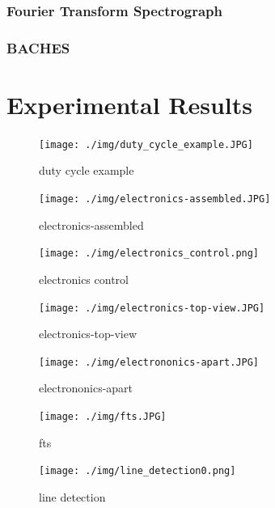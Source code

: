 \documentclass[master,       %
               twoside,        %
               BCOR10mm,       %
               ngerman,english  %
               ]{GAUBM_astro}
\begin{document}
\subsection{Fourier Transform Spectrograph}
\subsection{BACHES}

\chapter{Experimental Results}




\begin{figure}[h!]
\centering
\texttt{[image: ./img/duty\_cycle\_example.JPG]}
\caption{duty cycle example}
\label{fig:duty-cycle-example}
\end{figure}


\begin{figure}[h!]
\centering
\texttt{[image: ./img/electronics-assembled.JPG]}
\caption{electronics-assembled}
\label{fig:electronics-assembled}
\end{figure}


\begin{figure}[h!]
\centering
\texttt{[image: ./img/electronics\_control.png]}
\caption{electronics control}
\label{fig:electronics-control}
\end{figure}


\begin{figure}[h!]
\centering
\texttt{[image: ./img/electronics-top-view.JPG]}
\caption{electronics-top-view}
\label{fig:electronics-top-view}
\end{figure}


\begin{figure}[h!]
\centering
\texttt{[image: ./img/electrononics-apart.JPG]}
\caption{electrononics-apart}
\label{fig:electrononics-apart}
\end{figure}



\begin{figure}[h!]
\centering
\texttt{[image: ./img/fts.JPG]}
\caption{fts}
\label{fig:fts}
\end{figure}


\begin{figure}[h!]
\centering
\texttt{[image: ./img/line\_detection0.png]}
\caption{line detection}
\label{fig:line-detection}
\end{figure}
\end{document}
